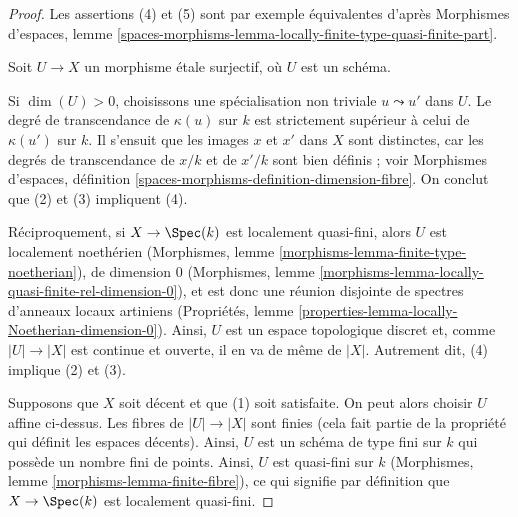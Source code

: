 \begin{proof}
Les assertions (4) et (5) sont par exemple équivalentes d'après
Morphismes d'espaces, lemme
\ref{spaces-morphisms-lemma-locally-finite-type-quasi-finite-part}.

\medskip\noindent
Soit $U \to X$ un morphisme étale surjectif, où $U$ est un schéma.

\medskip\noindent
Si $\dim(U) > 0$, choisissons une spécialisation non triviale
$u \leadsto u'$ dans $U$. Le degré de transcendance de $\kappa(u)$ sur $k$
est strictement supérieur à celui de $\kappa(u')$ sur $k$.
Il s'ensuit que les images $x$ et $x'$ dans $X$ sont distinctes, car les
degrés
de transcendance de $x/k$ et de $x'/k$ sont bien définis ; voir
Morphismes d'espaces, définition
\ref{spaces-morphisms-definition-dimension-fibre}.
On conclut que (2) et (3) impliquent (4).

\medskip\noindent
Réciproquement, si $X \to \Spec(k)$ est localement quasi-fini, alors $U$ est
localement noethérien
(Morphismes, lemme \ref{morphisms-lemma-finite-type-noetherian}),
de dimension $0$
(Morphismes, lemme
\ref{morphisms-lemma-locally-quasi-finite-rel-dimension-0}),
et est donc une réunion disjointe de spectres d'anneaux locaux artiniens
(Propriétés, lemme \ref{properties-lemma-locally-Noetherian-dimension-0}).
Ainsi, $U$ est un espace topologique discret et, comme $|U| \to |X|$ est
continue et ouverte, il en va de même de $|X|$.
Autrement dit, (4) implique (2) et (3).

\medskip\noindent
Supposons que $X$ soit décent et que (1) soit satisfaite. On peut alors
choisir $U$ affine ci-dessus. Les fibres de $|U| \to |X|$ sont finies
(cela fait partie
de la propriété qui définit les espaces décents). Ainsi, $U$ est un schéma de
type fini sur $k$ qui possède un nombre fini de points. Ainsi, $U$ est
quasi-fini
sur $k$ (Morphismes, lemme \ref{morphisms-lemma-finite-fibre}),
ce qui signifie par définition que $X \to \Spec(k)$ est localement quasi-fini.
\end{proof}

